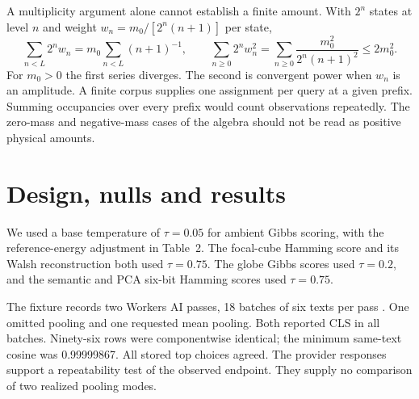 \documentclass[11pt,a4paper]{article}
\begin{document}
A multiplicity argument alone cannot establish a finite amount. With $2^n$ states at level $n$ and weight $w_n=m_0/[2^n(n+1)]$ per state,
\begin{equation}
 \sum_{n<L}2^nw_n=m_0\sum_{n<L}(n+1)^{-1},\qquad
 \sum_{n\ge0}2^n w_n^2=\sum_{n\ge0}\frac{m_0^2}{2^n(n+1)^2}\le2m_0^2 .
\end{equation}
For $m_0>0$ the first series diverges. The second is convergent power when $w_n$ is an amplitude. A finite corpus supplies one assignment per query at a given prefix. Summing occupancies over every prefix would count observations repeatedly. The zero-mass and negative-mass cases of the algebra should not be read as positive physical amounts.

\section{Design, nulls and results}
We used a base temperature of $\tau=0.05$ for ambient Gibbs scoring, with the reference-energy adjustment in Table~2. The focal-cube Hamming score and its Walsh reconstruction both used $\tau=0.75$. The globe Gibbs scores used $\tau=0.2$, and the semantic and PCA six-bit Hamming scores used $\tau=0.75$.

The fixture records two Workers AI passes, 18 batches of six texts per pass \citep{bge,cf}. One omitted pooling and one requested mean pooling. Both reported CLS in all batches. Ninety-six rows were componentwise identical; the minimum same-text cosine was 0.99999867. All stored top choices agreed. The provider responses support a repeatability test of the observed endpoint. They supply no comparison of two realized pooling modes.
\end{document}
